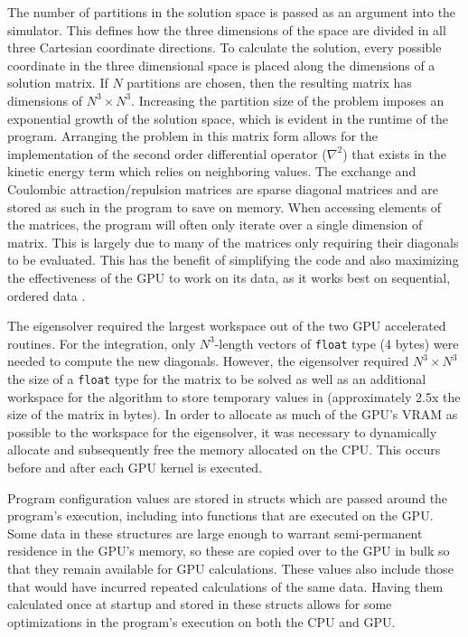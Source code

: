 \documentclass[conference, twoside]{IEEEtran}
\begin{document}
The number of partitions in the solution space is passed as an argument into the simulator. This defines how the three dimensions of the space are divided in all three Cartesian coordinate directions. To calculate the solution, every possible coordinate in the three dimensional space is placed along the dimensions of a solution matrix. If $N$ partitions are chosen, then the resulting matrix has dimensions of $N^3 \times N^3$. Increasing the partition size of the problem imposes an exponential growth of the solution space, which is evident in the runtime of the program. Arranging the problem in this matrix form allows for the implementation of the second order differential operator ($\nabla^2$) that exists in the kinetic energy term which relies on neighboring values. The exchange and Coulombic attraction/repulsion matrices are sparse diagonal matrices and are stored as such in the program to save on memory. When accessing elements of the matrices, the program will often only iterate over a single dimension of matrix. This is largely due to many of the matrices only requiring their diagonals to be evaluated. This has the benefit of simplifying the code and also maximizing the effectiveness of the GPU to work on its data, as it works best on sequential, ordered data \cite{special-purpose-hf-computer}.

The eigensolver required the largest workspace out of the two GPU accelerated routines. For the integration, only $N^3$-length vectors of \texttt{float} type (4 bytes) were needed to compute the new diagonals. However, the eigensolver required $N^3 \times N^3$ the size of a \texttt{float} type for the matrix to be solved as well as an additional workspace for the algorithm to store temporary values in (approximately 2.5x the size of the matrix in bytes). In order to allocate as much of the GPU's VRAM as possible to the workspace for the eigensolver, it was necessary to dynamically allocate and subsequently free the memory allocated on the CPU. This occurs before and after each GPU kernel is executed.

Program configuration values are stored in structs which are passed around the program's execution, including into functions that are executed on the GPU. Some data in these structures are large enough to warrant semi-permanent residence in the GPU's memory, so these are copied over to the GPU in bulk so that they remain available for GPU calculations. These values also include those that would have incurred repeated calculations of the same data. Having them calculated once at startup and stored in these structs allows for some optimizations in the program's execution on both the CPU and GPU.
\end{document}
